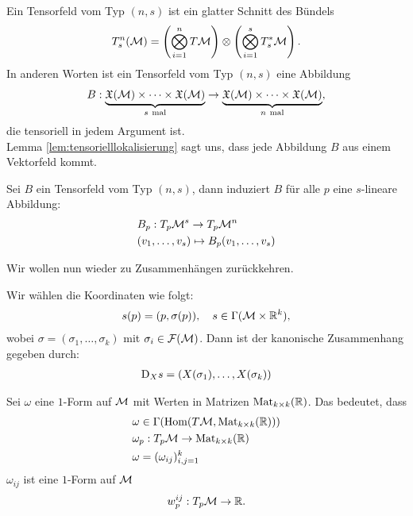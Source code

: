 \begin{defs}[Tensorfeld]
Ein Tensorfeld vom Typ $(n, s)$ ist ein glatter Schnitt des Bündels
\begin{align}
T^{n}_{s} (\mathcal{M}) = \left( \bigotimes^n_{i=1} T \mathcal{M} \right) \otimes \left(\bigotimes^s_{i=1} T_s^* \mathcal{M}\right).
\end{align}
In anderen Worten ist ein Tensorfeld vom Typ $(n, s)$ eine Abbildung
\begin{align}
B : \underbrace{\mathfrak{X}(\mathcal{M}) \times \cdots \times \mathfrak{X}(\mathcal{M})}_{s \ \mathrm{mal}} \to \underbrace{\mathfrak{X}(\mathcal{M}) \times \cdots \times \mathfrak{X}(\mathcal{M})}_{n \ \mathrm{mal}},
\end{align}
die tensoriell in jedem Argument ist.\\
Lemma \ref{lem:tensorielllokalisierung} sagt uns, dass jede Abbildung $B$ aus einem Vektorfeld kommt.
\end{defs}
\begin{kor}
Sei $B$ ein Tensorfeld vom Typ $(n, s)$, dann induziert $B$ für alle $p$ eine $s$-lineare Abbildung:
\begin{align}
&B_p: T_p \mathcal{M}^s \to T_p \mathcal{M}^n\\
&(v_1, \dots, v_s) \mapsto B_p (v_1, \dots, v_s)
\end{align}
\end{kor}
Wir wollen nun wieder zu Zusammenhängen zurückkehren.
\begin{bsp}
Wir wählen die Koordinaten wie folgt:
\begin{align}
s(p) = (p, \sigma(p)), \quad s \in \Gamma(\mathcal{M} \times \mathbb{R}^k),
\end{align}
wobei $\sigma = (\sigma_1, \dots, \sigma_k)$ mit $\sigma_i \in \mathcal{F}(\mathcal{M})$.
Dann ist der kanonische Zusammenhang gegeben durch:
\begin{align}
\mathrm{D}_X s = (X(\sigma_1), \dots, X(\sigma_k))
\end{align}
\end{bsp}

Sei $\omega$ eine $1$-Form auf $\mathcal{M}$ mit Werten in Matrizen $\mathrm{Mat}_{k \times k}(\mathbb{R})$.
Das bedeutet, dass
\begin{align}
&\omega \in \Gamma(\mathrm{Hom}(T\mathcal{M}, \mathrm{Mat}_{k \times k}(\mathbb{R}))) \\
&\omega_p: T_p \mathcal{M} \to \mathrm{Mat}_{k \times k}(\mathbb{R}) \\
&\omega = (\omega_{ij})^k_{i,j=1}
\end{align}
$\omega_{ij}$ ist eine $1$-Form auf $\mathcal{M}$
\begin{align}
w^{ij}_p :T_p \mathcal{M} \to \mathbb{R}.
\end{align}

